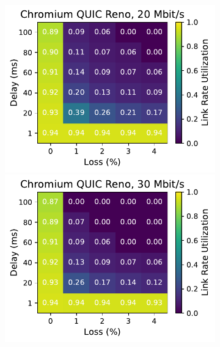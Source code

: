 \begin{figure}[ht]
\begin{subfigure}[b]{0.22\linewidth}
        \includegraphics[width=\linewidth,trim={0 0 2cm 0},clip]{splitting-paper/figures/heatmaps/heatmap_quic_reno_20mbps.pdf}
        \includegraphics[width=\linewidth,trim={0 0 2cm 0},clip]{splitting-paper/figures/heatmaps/heatmap_quic_reno_30mbps.pdf}

\end{subfigure}
\end{figure}
